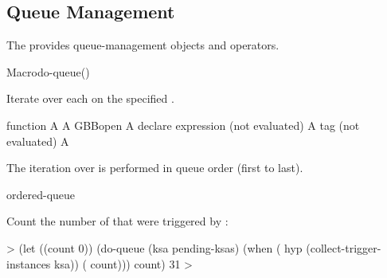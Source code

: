 \documentclass[10pt,twoside,english,pdftex]{article}
\begin{document}

\T\markright{}%
\T\pagestyle{plain}
\T\clearpage
\W{}
\T\pagestyle{fancy}
\T\thispagestyle{fancybottom}
\T\global\def\fnlastname{ }%
\subsection{Queue Management}
\label{sec:queue}%

%
%
%
The   provides queue-management objects and
operators.

\W\entities
\T\clearpage


\begin{functiondoc}{Macro}{do-queue}{()
    }
%
%

\fnsyntax

\fnpurpose Iterate over each  on the
specified .

\fnpackage {}

\fnmodule {}

\fnargs
\begin{args}{function}
\arg[var] A 
\arg[queue] A GBBopen 
\arg[declaration] A declare expression (not evaluated)
\arg[tag] A  tag (not evaluated)
\arg[form] A 
\end{args}

\fndescription The iteration over  is performed
in queue order (first to last).

\begin{alsos}{ordered-queue}
\also[queue]
\end{alsos}

\fnexample
{}%
%
%
%
Count the number of  that were triggered by :
%
\W\supp
\begin{example}
  > (let ((count 0))
      (do-queue (ksa pending-ksas)
        (when ( hyp (collect-trigger-instances ksa))
          ( count)))
       count)
  31
  >
\end{example}

\end{functiondoc}
\end{document}
